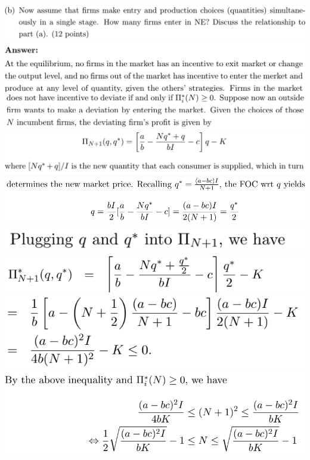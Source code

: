 \documentclass[8pt,landscape]{extarticle}
\begin{document}
\begin{multicols*}{3}
    \includegraphics[width=0.73\linewidth,keepaspectratio]{Screenshots/Screenshot 2024-03-11 171741.png}
    \includegraphics[width=0.7\linewidth,keepaspectratio]{Screenshots/Screenshot 2024-03-11 171749.png}
    \includegraphics[width=0.7\linewidth,keepaspectratio]{Screenshots/Screenshot 2024-03-11 171800.png}
    \includegraphics[width=0.7\linewidth,keepaspectratio]{Screenshots/Screenshot 2024-03-11 171807.png}
    \includegraphics[width=0.66\linewidth,keepaspectratio]{Screenshots/Screenshot 2024-03-11 171820.png}
    \includegraphics[width=0.35\linewidth,keepaspectratio]{Screenshots/Screenshot 2024-03-11 171826.png}
    \includegraphics[width=0.45\linewidth,keepaspectratio]{Screenshots/Screenshot 2024-03-11 171832.png}
    \includegraphics[width=0.43\linewidth,keepaspectratio]{Screenshots/Screenshot 2024-03-11 171837.png}
    \includegraphics[width=0.55\linewidth,keepaspectratio]{Screenshots/Screenshot 2024-03-11 171842.png}

\end{multicols*}
\end{document}
